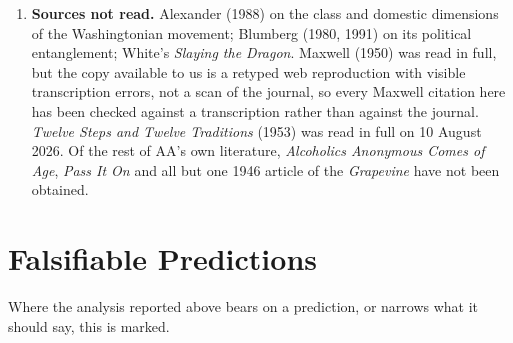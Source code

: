 \documentclass[11pt,a4paper]{article}
\begin{document}
\begin{enumerate}
\item \textbf{Sources not read.} Alexander (1988) on the class and domestic
dimensions of the Washingtonian movement; Blumberg (1980, 1991) on its political
entanglement; White's \emph{Slaying the Dragon}. Maxwell (1950) was read in full, but the copy
available to us is a retyped web reproduction with visible transcription errors,
not a scan of the journal, so every Maxwell citation here has been checked against
a transcription rather than against the journal. \emph{Twelve Steps and Twelve Traditions} (1953) was read in
full on 10 August 2026. Of the rest of AA's own literature, \emph{Alcoholics Anonymous
Comes of Age}, \emph{Pass It On} and all but one 1946 article of the \emph{Grapevine} have
not been obtained.
\end{enumerate}

\section{Falsifiable Predictions}

Where the analysis reported above bears on a prediction, or narrows what it should
say, this is marked.
\end{document}
